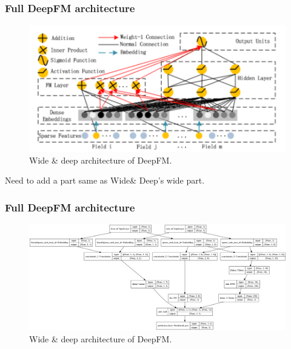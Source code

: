 \documentclass{beamer}
\begin{document}
\begin{frame}
	\frametitle{Full DeepFM architecture}
	\begin{figure}
		\includegraphics[scale=0.25]{full_deepFM}
		\caption{Wide \& deep architecture of DeepFM.}
	\end{figure}
	Need to add a part same as Wide\& Deep's wide part.
\end{frame}

\begin{frame}
	\frametitle{Full DeepFM architecture}
	\begin{figure}
		\includegraphics[scale=0.16]{custom_deepFM}
		\caption{Wide \& deep architecture of DeepFM.}
	\end{figure}
\end{frame}
\end{document}
